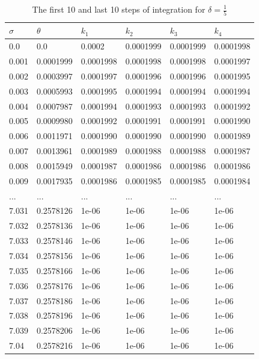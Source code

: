 \documentclass[12pt]{article}\pagestyle{myheadings}
\theoremstyle{plain}
\begin{document}
\begin{table}[ht!]
\centering
\begin{tabular} {| l | l | l | l | l | l |}
\hline
$\sigma$ & $\theta$ & $k_{1}$ & $k_{2}$ & $k_{3}$ & $k_{4}$ \\
\hline
0.0 & 0.0 & 0.0002 & 0.0001999 & 0.0001999 & 0.0001998 \\
0.001 & 0.0001999 & 0.0001998 & 0.0001998 & 0.0001998 & 0.0001997 \\
0.002 & 0.0003997 & 0.0001997 & 0.0001996 & 0.0001996 & 0.0001995 \\
0.003 & 0.0005993 & 0.0001995 & 0.0001994 & 0.0001994 & 0.0001994 \\
0.004 & 0.0007987 & 0.0001994 & 0.0001993 & 0.0001993 & 0.0001992 \\
0.005 & 0.0009980 & 0.0001992 & 0.0001991 & 0.0001991 & 0.0001990 \\
0.006 & 0.0011971 & 0.0001990 & 0.0001990 & 0.0001990 & 0.0001989 \\
0.007 & 0.0013961 & 0.0001989 & 0.0001988 & 0.0001988 & 0.0001987 \\
0.008 & 0.0015949 & 0.0001987 & 0.0001986 & 0.0001986 & 0.0001986 \\
0.009 & 0.0017935 & 0.0001986 & 0.0001985 & 0.0001985 & 0.0001984 \\
... & ... & ... & ... & ... & ... \\
7.031 & 0.2578126 & 1e-06 & 1e-06 & 1e-06 & 1e-06 \\
7.032 & 0.2578136 & 1e-06 & 1e-06 & 1e-06 & 1e-06 \\
7.033 & 0.2578146 & 1e-06 & 1e-06 & 1e-06 & 1e-06 \\
7.034 & 0.2578156 & 1e-06 & 1e-06 & 1e-06 & 1e-06 \\
7.035 & 0.2578166 & 1e-06 & 1e-06 & 1e-06 & 1e-06 \\
7.036 & 0.2578176 & 1e-06 & 1e-06 & 1e-06 & 1e-06 \\
7.037 & 0.2578186 & 1e-06 & 1e-06 & 1e-06 & 1e-06 \\
7.038 & 0.2578196 & 1e-06 & 1e-06 & 1e-06 & 1e-06 \\
7.039 & 0.2578206 & 1e-06 & 1e-06 & 1e-06 & 1e-06 \\
7.04 & 0.2578216 & 1e-06 & 1e-06 & 1e-06 & 1e-06 \\
\hline
\end{tabular}
\caption{The first 10 and last 10 steps of integration for $\delta = \frac{1}{5}$}
\end{table}

\break
\end{document}
